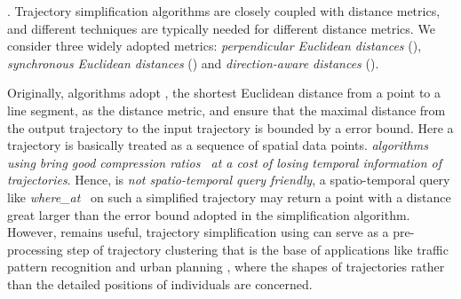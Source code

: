 .
Trajectory simplification algorithms are closely coupled with distance metrics,
and different techniques are typically needed for different distance metrics. We consider three
widely adopted metrics: \emph{perpendicular Euclidean distances} (\ped), \emph{synchronous Euclidean distances} (\sed) and \emph{direction-aware distances} (\dad).








Originally, \lsa algorithms adopt \ped, {the shortest Euclidean distance from a point to a line segment, as the distance metric, {and ensure that the maximal distance from the output trajectory to the input trajectory is bounded by a \ped error bound. Here a trajectory is basically treated as a sequence of spatial data points. } \emph{\lsa algorithms using \ped bring good compression ratios~\cite{Douglas:Peucker, Hershberger:Speeding, Liu:BQS, Muckell:Compression, Chen:Trajectory, Cao:Spatio, Shi:Survey} at a cost of losing temporal information of trajectories}.} {Hence, \ped is \emph{not spatio-temporal query friendly}, \ie a spatio-temporal query like \emph{where\_at}~\cite{Cao:Spatio} on such a simplified trajectory may return a point with a distance great larger than the \ped error bound adopted in the simplification algorithm. }
{However, \ped remains useful, \eg trajectory simplification using \ped can serve as a pre-processing step of trajectory clustering that is the base of applications like traffic pattern recognition and urban planning \cite{Mazimpaka:Mining, Zhao:Clustering}, where  the shapes of trajectories rather than the detailed positions of individuals are concerned.}

